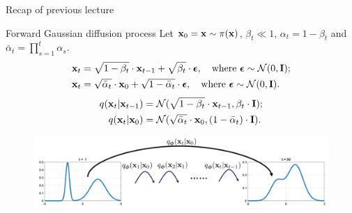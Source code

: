 \begin{frame}{Recap of previous lecture}
	\begin{block}{Forward Gaussian diffusion process}
		Let $\mathbf{x}_0 = \mathbf{x} \sim \pi(\mathbf{x})$, $\beta_t \ll 1$, $\alpha_t = 1 - \beta_t$ and $\bar{\alpha}_t = \prod_{s=1}^t \alpha_s$. 
		\begin{align*}
			\mathbf{x}_t &= \sqrt{1 - \beta_t} \cdot \mathbf{x}_{t - 1} + \sqrt{\beta_t} \cdot \boldsymbol{\epsilon}, \quad \text{where }\boldsymbol{\epsilon} \sim \mathcal{N}(0, \mathbf{I}); \\
			\mathbf{x}_t &= \sqrt{\bar{\alpha}_t} \cdot \mathbf{x}_{0} + \sqrt{1 - \bar{\alpha}_t} \cdot \boldsymbol{\epsilon}, \quad \text{where } \boldsymbol{\epsilon} \sim \mathcal{N}(0, \mathbf{I}).
		\end{align*}
		\vspace{-0.6cm}
		\begin{align*}
			q(\mathbf{x}_t | \mathbf{x}_{t-1}) &= \mathcal{N}(\sqrt{1 - \beta_t} \cdot \mathbf{x}_{t-1}, \beta_t \cdot \mathbf{I}); \\
			q(\mathbf{x}_t | \mathbf{x}_0) &= \mathcal{N}(\sqrt{\bar{\alpha}_t} \cdot \mathbf{x}_0, (1 - \bar{\alpha}_t) \cdot \mathbf{I}).
		\end{align*}
		\vspace{-0.6cm}
	\end{block}
	\begin{figure}
		\includegraphics[width=0.8\linewidth]{figs/conditional_diffusion}
	\end{figure}
\end{frame}
